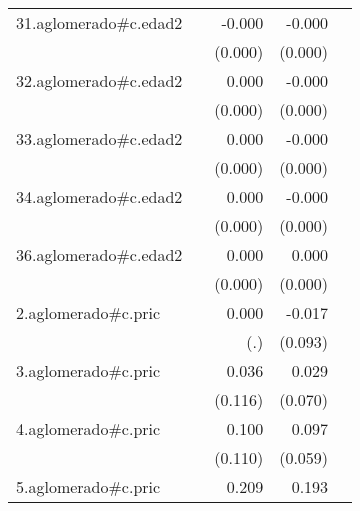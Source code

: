 {\begin{longtable}{l*{4}{D{.}{.}{-1}}}
\addlinespace
31.aglomerado#c.edad2&                     &      -0.000         &      -0.000\sym{***}&                     \\
            &                     &     (0.000)         &     (0.000)         &                     \\
\addlinespace
32.aglomerado#c.edad2&                     &       0.000         &      -0.000\sym{***}&                     \\
            &                     &     (0.000)         &     (0.000)         &                     \\
\addlinespace
33.aglomerado#c.edad2&                     &       0.000         &      -0.000         &                     \\
            &                     &     (0.000)         &     (0.000)         &                     \\
\addlinespace
34.aglomerado#c.edad2&                     &       0.000         &      -0.000         &                     \\
            &                     &     (0.000)         &     (0.000)         &                     \\
\addlinespace
36.aglomerado#c.edad2&                     &       0.000         &       0.000         &                     \\
            &                     &     (0.000)         &     (0.000)         &                     \\
\addlinespace
2.aglomerado#c.pric&                     &       0.000         &      -0.017         &                     \\
            &                     &         (.)         &     (0.093)         &                     \\
\addlinespace
3.aglomerado#c.pric&                     &       0.036         &       0.029         &                     \\
            &                     &     (0.116)         &     (0.070)         &                     \\
\addlinespace
4.aglomerado#c.pric&                     &       0.100         &       0.097         &                     \\
            &                     &     (0.110)         &     (0.059)         &                     \\
\addlinespace
5.aglomerado#c.pric&                     &       0.209         &       0.193\sym{*}  &                     \\

\end{longtable}}
